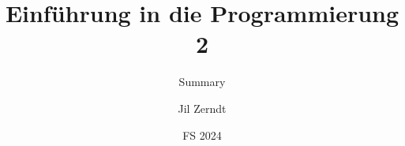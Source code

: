 \documentclass[a4paper, fontsize = 8pt, landscape]{scrartcl}
\title{Einführung in die Programmierung 2}
\subtitle{Summary}
\author{Jil Zerndt}
\date{FS 2024}
\begin{document}
\begin{multicols}{2}
	\thispagestyle{TitlePageStyle}
	\maketitleinfo
	\sffamily
	
	\raggedcolumns
	\columnbreak 
\end{multicols}
\end{document}
